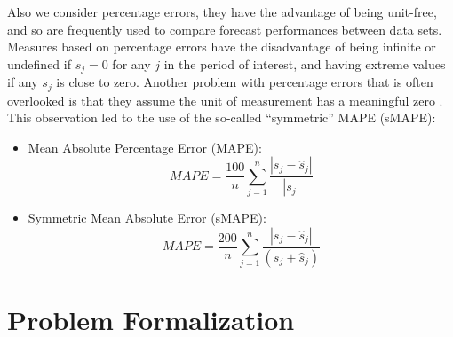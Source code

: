 Also we consider percentage errors, they have the advantage of being unit-free, and so are frequently used to compare forecast performances between data sets. Measures based on percentage errors have the disadvantage of being infinite or undefined if $s_{j}=0$ for any $j$ in the period of interest, and having extreme values if any $s_{j}$ is close to zero. Another problem with percentage errors that is often overlooked is that they assume the unit of measurement has a meaningful zero \cite{Hyndman2006}. This observation led to the use of the so-called ``symmetric'' MAPE (sMAPE):

\begin{itemize}	
	\item Mean Absolute Percentage Error (MAPE):
	\begin{equation}
	MAPE = \frac{100}{n}\sum_{j=1}^{n} \frac{\left|s_j - \hat{s}_j\right|}{|s_j|}
	\end{equation}	
	\item Symmetric Mean Absolute Error (sMAPE):	
	\begin{equation}
	MAPE = \frac{200}{n}\sum_{j=1}^{n} \frac{\left|s_j - \hat{s}_j\right|}{\left(s_{j}+\hat{s}_{j}\right)}
	\end{equation}	
	
\end{itemize}



\section{Problem Formalization}
\label{Sec:ProblemFormalization}

